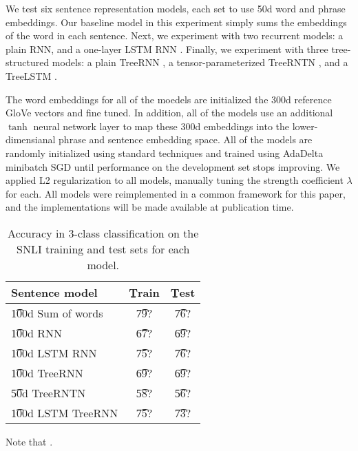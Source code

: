 We test six sentence representation models, each set to use 50d word and phrase embeddings. Our baseline model in this experiment simply sums the embeddings of the word in each sentence. Next, we experiment with two recurrent models: a plain RNN, and a one-layer LSTM RNN \cite{hochreiter1997long}. Finally, we experiment with three tree-structured models: a plain TreeRNN \cite{socher2011semi}, a tensor-parameterized TreeRNTN \cite{socher2013acl1}, and a TreeLSTM \cite{tai2015improved}.

The word embeddings for all of the moedels are initialized the 300d reference GloVe vectors \cite{pennington2014glove} and fine tuned. In addition, all of the models use an additional $\tanh$ neural network layer to map these 300d embeddings into the lower-dimensianal phrase and sentence embedding space. All of the models are randomly initialized using standard techniques and trained using AdaDelta \cite{zeiler2012adadelta} minibatch SGD until performance on the development set stops improving. We applied L2 regularization to all models, manually tuning the strength coefficient $\lambda$ for each. All models were reimplemented in a common framework for this paper, and the implementations will be made available at publication time.

\begin{table}
\begin{center}
\begin{tabular}{l@{\hskip \colspaceL}@{\hskip \colspaceL}c@{\hskip \colspaceL}c}
\hline
\textbf{Sentence model} & \b{Train}  & \b{Test}\\
\hline
\t{100d Sum of words}            & \t{79?} & \t{76?} \\
\t{100d RNN}            & \t{67?} & \t{69?} \\	
\t{100d LSTM RNN}            & \t{75?} & \t{76?} \\
\t{100d TreeRNN}            & \t{69?} & \t{69?} \\
\t{50d TreeRNTN}            & \t{58?} & \t{56?} \\
\t{100d LSTM TreeRNN}            & \t{75?} & \t{73?} \\
\hline
\end{tabular}
\end{center}
\caption{
\label{tab:nnresults}
Accuracy in 3-class classification on the SNLI training and test sets for each model.
}
\end{table}

Note that .
